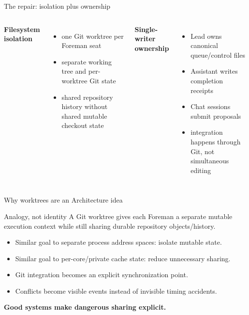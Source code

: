 \documentclass{beamer}
\begin{document}
\begin{frame}{The repair: isolation plus ownership}
\begin{columns}[T]
\textbf{Filesystem isolation}
\begin{itemize}
  \item one Git worktree per Foreman seat
  \item separate working tree and per-worktree Git state
  \item shared repository history without shared mutable checkout state
\end{itemize}

\textbf{Single-writer ownership}
\begin{itemize}
  \item Lead owns canonical queue/control files
  \item Assistant writes completion receipts
  \item Chat sessions submit proposals
  \item integration happens through Git, not simultaneous editing
\end{itemize}
\end{columns}
\end{frame}

\begin{frame}{Why worktrees are an Architecture idea}
\begin{block}{Analogy, not identity}
A Git worktree gives each Foreman a separate mutable execution context while still sharing durable repository objects/history.
\end{block}

\begin{itemize}
  \item Similar goal to separate process address spaces: isolate mutable state.
  \item Similar goal to per-core/private cache state: reduce unnecessary sharing.
  \item Git integration becomes an explicit synchronization point.
  \item Conflicts become visible events instead of invisible timing accidents.
\end{itemize}

\vspace{0.5em}
\textbf{Good systems make dangerous sharing explicit.}
\end{frame}
\end{document}
